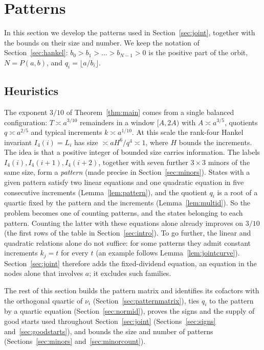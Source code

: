 \documentclass[11pt]{article}
\theoremstyle{definition}
\theoremstyle{remark}
\begin{document}
\section{Patterns}\label{sec:patterns}

In this section we develop the patterns used in Section~\ref{sec:joint}, together with the
bounds on their size and number. We keep the notation of
Section~\ref{sec:hankel}: $b_0>b_1>\dots>b_{N-1}>0$ is the positive part of the orbit,
$N=P(a,b)$, and $q_i=\lfloor a/b_i\rfloor$.

\subsection{Heuristics}
The exponent $3/10$ of Theorem~\ref{thm:main} comes from a single balanced configuration:
$T\asymp a^{3/10}$ remainders in a window $[A,2A)$ with $A\asymp a^{3/5}$, quotients
$q\asymp a^{2/5}$ and typical increments $k\asymp a^{1/10}$. At this scale the rank-four Hankel
invariant $I_4(i)=L_i$ has size $\asymp aH^6/q^4\asymp 1$, where $H$ bounds the increments.
The idea is that a positive integer of bounded size carries information. The labels
$I_4(i),I_4(i+1),I_4(i+2)$, together with seven further $3\times3$ minors of the same size, form a
\emph{pattern} (made precise in Section~\ref{sec:minors}). States with a given pattern satisfy two linear equations and one quadratic
equation in five consecutive increments (Lemma~\ref{lem:pattern}), and the quotient $q_i$ is a
root of a quartic fixed by the pattern and the increments (Lemma~\ref{lem:multid}). So the
problem becomes one of counting patterns, and the states belonging to each pattern. Counting the
latter with these equations alone already improves on $3/10$ (the first rows of the table in
Section~\ref{sec:intro}). To go further, the linear and quadratic relations alone do not
suffice: for some patterns they admit constant increments $k_j=t$ for every $t$
(an example follows Lemma~\ref{lem:jointcurve}). Section~\ref{sec:joint} therefore adds
the fixed-dividend equation, an equation in the nodes alone that involves $a$;
it excludes such families.

The rest of this section builds the pattern matrix and identifies its
cofactors with the orthogonal quartic of $\nu_i$ (Section~\ref{sec:patternmatrix}), ties $q_i$ to
the pattern by a quartic equation (Section~\ref{sec:normid}), proves the signs and the
supply of good starts used throughout Section~\ref{sec:joint} (Sections~\ref{sec:signs}
and~\ref{sec:goodstarts}), and bounds the size and number of patterns
(Sections~\ref{sec:minors} and~\ref{sec:minorcount}).
\end{document}

